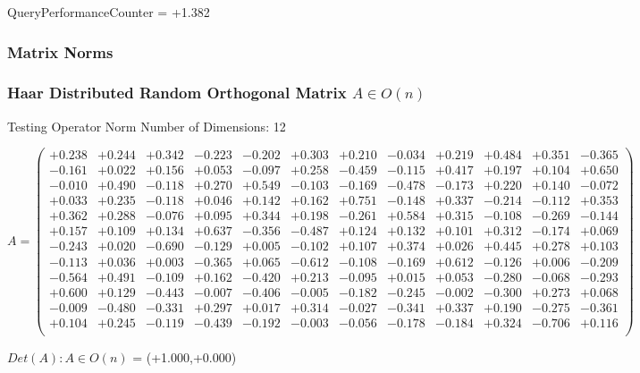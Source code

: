 \documentclass[9pt]{article}
\theoremstyle{plain}
\theoremstyle{definition}
\theoremstyle{remark}
\numberwithin{equation}{section}
\begin{document}
QueryPerformanceCounter  =  +1.382
\subsubsection{Matrix Norms}
\subsubsection{Haar Distributed Random Orthogonal Matrix $A \in O(n)$}
 Testing Operator Norm
Number of Dimensions: 12

$A = \left(
\begin{array}{
cccccccccccc}
+0.238 & +0.244 & +0.342 & -0.223 & -0.202 & +0.303 & +0.210 & -0.034 & +0.219 & +0.484 & +0.351 & -0.365 \\
-0.161 & +0.022 & +0.156 & +0.053 & -0.097 & +0.258 & -0.459 & -0.115 & +0.417 & +0.197 & +0.104 & +0.650 \\
-0.010 & +0.490 & -0.118 & +0.270 & +0.549 & -0.103 & -0.169 & -0.478 & -0.173 & +0.220 & +0.140 & -0.072 \\
+0.033 & +0.235 & -0.118 & +0.046 & +0.142 & +0.162 & +0.751 & -0.148 & +0.337 & -0.214 & -0.112 & +0.353 \\
+0.362 & +0.288 & -0.076 & +0.095 & +0.344 & +0.198 & -0.261 & +0.584 & +0.315 & -0.108 & -0.269 & -0.144 \\
+0.157 & +0.109 & +0.134 & +0.637 & -0.356 & -0.487 & +0.124 & +0.132 & +0.101 & +0.312 & -0.174 & +0.069 \\
-0.243 & +0.020 & -0.690 & -0.129 & +0.005 & -0.102 & +0.107 & +0.374 & +0.026 & +0.445 & +0.278 & +0.103 \\
-0.113 & +0.036 & +0.003 & -0.365 & +0.065 & -0.612 & -0.108 & -0.169 & +0.612 & -0.126 & +0.006 & -0.209 \\
-0.564 & +0.491 & -0.109 & +0.162 & -0.420 & +0.213 & -0.095 & +0.015 & +0.053 & -0.280 & -0.068 & -0.293 \\
+0.600 & +0.129 & -0.443 & -0.007 & -0.406 & -0.005 & -0.182 & -0.245 & -0.002 & -0.300 & +0.273 & +0.068 \\
-0.009 & -0.480 & -0.331 & +0.297 & +0.017 & +0.314 & -0.027 & -0.341 & +0.337 & +0.190 & -0.275 & -0.361 \\
+0.104 & +0.245 & -0.119 & -0.439 & -0.192 & -0.003 & -0.056 & -0.178 & -0.184 & +0.324 & -0.706 & +0.116 \\
\end{array}
\right)$ \newline 

$Det(A) :   A \in O(n)$ = (+1.000,+0.000)
\end{document}

